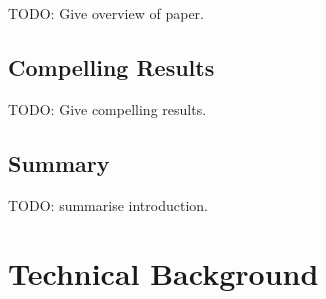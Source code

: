 \documentclass[a4paper,12pt,twoside,openright]{report}
\begin{document}
TODO: Give overview of paper.

\section{Compelling Results}

TODO: Give compelling results.

\section{Summary}

TODO: summarise introduction.

\chapter{Technical Background}





\end{document}
